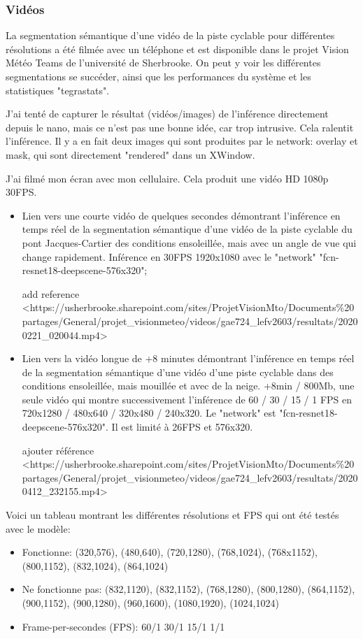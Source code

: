 \subsubsection{Vidéos}
\par La segmentation sémantique d'une vidéo de la piste cyclable pour différentes résolutions a été filmée avec un téléphone et est disponible dans le projet Vision Météo Teams de l'université de Sherbrooke. On peut y voir les différentes segmentations se succéder, ainsi que les performances du système et les statistiques "tegrastats". 
\par J'ai tenté de capturer le résultat (vidéos/images) de l'inférence directement depuis le nano, mais ce n'est pas une bonne idée, car trop intrusive. Cela ralentit l'inférence. Il y a en fait deux images qui sont produites par le network: overlay et mask, qui sont directement "rendered" dans un XWindow. 
\par J'ai filmé mon écran avec mon cellulaire. Cela produit une vidéo HD 1080p 30FPS. 
\begin{itemize}
   \item Lien vers une courte vidéo de quelques secondes démontrant l'inférence en temps réel de la segmentation sémantique d'une vidéo de la piste cyclable du pont Jacques-Cartier des conditions ensoleillée, mais avec un angle de vue qui change rapidement. Inférence en 30FPS 1920x1080 avec le "network" "fcn-resnet18-deepscene-576x320"; {\color{red} \par add reference <https://usherbrooke.sharepoint.com/sites/ProjetVisionMto/Documents\%20partages/General/projet\_visionmeteo/videos/gae724\_lefv2603/resultats/20200221\_020044.mp4> }
   \item Lien vers la vidéo longue de +8 minutes démontrant l'inférence en temps réel de la segmentation sémantique d'une vidéo d'une piste cyclable dans des conditions ensoleillée, mais mouillée et avec de la neige. +8min / 800Mb, une seule vidéo qui montre successivement l'inférence de 60 / 30 / 15 / 1 FPS en 720x1280 / 480x640 / 320x480 / 240x320. Le "network" est "fcn-resnet18-deepscene-576x320". Il est limité à 26FPS et 576x320. {\color{red} \par ajouter référence <https://usherbrooke.sharepoint.com/sites/ProjetVisionMto/Documents\%20partages/General/projet\_visionmeteo/videos/gae724\_lefv2603/resultats/20200412\_232155.mp4> }
\end{itemize}
\par Voici un tableau montrant les différentes résolutions et FPS qui ont été testés avec le modèle:
{
   \color{red}
   \begin{itemize}
      \item Fonctionne: (320,576), (480,640), (720,1280), (768,1024), (768x1152), (800,1152), (832,1024), (864,1024)
      \item Ne fonctionne pas: (832,1120), (832,1152), (768,1280), (800,1280), (864,1152), (900,1152), (900,1280), (960,1600), (1080,1920), (1024,1024)
      \item Frame-per-secondes (FPS): 60/1 30/1 15/1 1/1
   \end{itemize} 
}